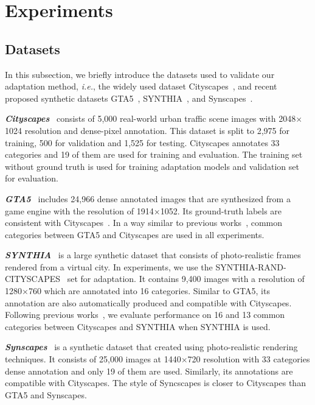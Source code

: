 \documentclass[final]{cvpr}
\def\ie{\textit{i.e.}}
\begin{document}
\section{Experiments}
\subsection{Datasets}
In this subsection, we briefly introduce the datasets used to validate our adaptation method, \ie, the widely used dataset Cityscapes~\cite{cordts2016cityscapes}, and recent proposed synthetic datasets GTA5~\cite{Richter_2016_ECCV}, SYNTHIA~\cite{Ros_2016_CVPR}, and Synscapes~\cite{wrenninge2018synscapes}.

\textbf{\textit{Cityscapes}}~\cite{cordts2016cityscapes} consists of 5,000 real-world urban traffic scene images with 2048$\times$1024 resolution and dense-pixel annotation. This dataset is split to 2,975 for training, 500 for validation and 1,525 for testing. Cityscapes annotates 33 categories and 19 of them are used for training and evaluation. The training set without ground truth is used for training adaptation models and validation set for evaluation. 

\textbf{\textit{GTA5}}~\cite{Richter_2016_ECCV} includes 24,966 dense annotated images that are synthesized from a game engine with the resolution of 1914$\times$1052. Its ground-truth labels are consistent with Cityscapes~\cite{cordts2016cityscapes}. In a way similar to previous works~\cite{li2019bidirectional, vu2019advent}, common categories between GTA5 and Cityscapes are used in all experiments. 

\textbf{\textit{SYNTHIA}}~\cite{Ros_2016_CVPR} is a large synthetic dataset that consists of photo-realistic frames rendered from a virtual city. In experiments, we use the SYNTHIA-RAND-CITYSCAPES~\cite{Ros_2016_CVPR} set for adaptation. It contains 9,400 images with a resolution of 1280$\times$760 which are annotated into 16 categories. Similar to GTA5, its annotation are also automatically produced and compatible with Cityscapes. Following previous works~\cite{FDA_Yang_2020_CVPR, tsai2018learning, vu2019advent}, we evaluate performance on 16 and 13 common categories between Cityscapes and SYNTHIA when SYNTHIA is used.

\textbf{\textit{Synscapes}}~\cite{wrenninge2018synscapes} is a synthetic dataset that created using photo-realistic rendering techniques. It consists of 25,000 images at 1440$\times$720 resolution with 33 categories dense annotation and only 19 of them are used. Similarly, its annotations are compatible with Cityscapes. The style of Syncscapes is closer to Cityscapes than GTA5 and Synscapes.
\end{document}

